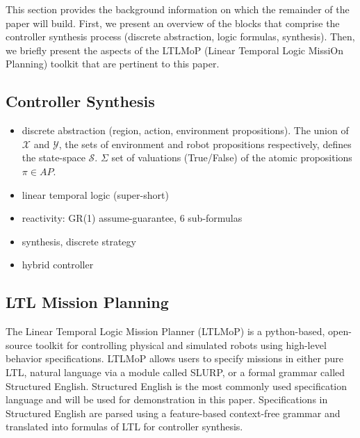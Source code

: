 This section provides the background information on which the remainder of the paper will build. First, we present an overview of the blocks that comprise the controller synthesis process (discrete abstraction, logic formulas, synthesis). Then, we briefly present the aspects of the LTLMoP (Linear Temporal Logic MissiOn Planning) toolkit that are pertinent to this paper.

\subsection{Controller Synthesis}\label{preliminariesA}

\begin{itemize}
	\item discrete abstraction (region, action, environment propositions). The union of $\mathcal{X}$ and $\mathcal{Y}$, the sets of environment and robot propositions respectively, defines the state-space $\mathcal{S}$. $\Sigma$ set of valuations (True/False) of the atomic propositions $\pi \in AP$.
	\item linear temporal logic (super-short)
	\item reactivity: GR(1) assume-guarantee, 6 sub-formulas
	\item synthesis, discrete strategy
	\item hybrid controller
\end{itemize}

\subsection{LTL Mission Planning}

The Linear Temporal Logic Mission Planner (LTLMoP) \cite{Finucane2010} is a python-based, open-source toolkit for controlling physical and simulated robots using high-level behavior specifications. LTLMoP allows users to specify missions in either pure LTL, natural language via a module called SLURP, or a formal grammar called Structured English. Structured English is the most commonly used specification language and will be used for demonstration in this paper. Specifications in Structured English are parsed using a feature-based context-free grammar and translated into formulas of LTL for controller synthesis. 